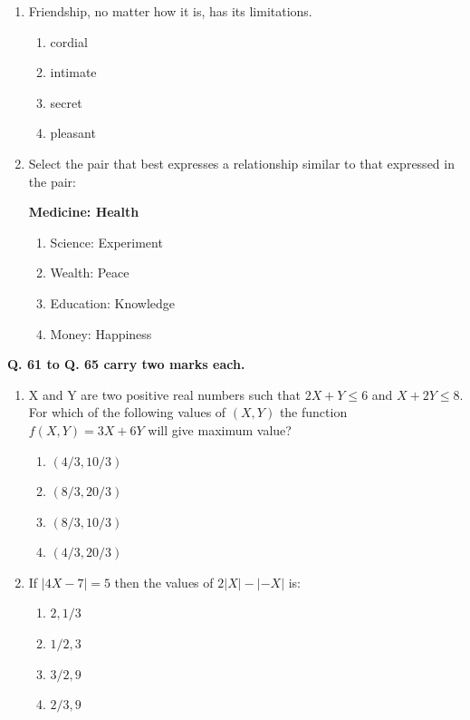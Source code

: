 \documentclass[14pt, a4paper]{extarticle}
\begin{document}
\begin{enumerate}[label=\textbf{Q. \arabic*}]
\begin{enumerate}[label=\textbf{Q.\arabic*}, start=56]
\item Friendship, no matter how \underline{\hspace{8em}} it is, has its limitations.
    \begin{enumerate}
        \item cordial
        \item intimate
        \item secret
        \item pleasant
    \end{enumerate}

\item Select the pair that best expresses a relationship similar to that expressed in the pair:
    \begin{center}
        \textbf{Medicine: Health}
    \end{center}
    \begin{multicols}{2}
        \begin{enumerate}
            \item Science: Experiment
            \item Wealth: Peace
            \item Education: Knowledge
            \item Money: Happiness
        \end{enumerate}
    \end{multicols}
\end{enumerate}

\textbf{Q. 61 to Q. 65 carry two marks each.}

\begin{enumerate}[label=\textbf{Q.\arabic*}, start=61]

    \item X and Y are two positive real numbers such that $2X + Y \le 6$ and $X + 2Y \le 8$. For which of the following values of $(X,Y)$ the function $f(X,Y) = 3X + 6Y$ will give maximum value?
    \begin{enumerate}
        \item $(4/3, 10/3)$
        \item $(8/3, 20/3)$
        \item $(8/3, 10/3)$
        \item $(4/3, 20/3)$
    \end{enumerate}

    \item If $|4X - 7| = 5$ then the values of $2|X| - |-X|$ is:
    \begin{multicols}{4}
        \begin{enumerate}
            \item $2, 1/3$
            \item $1/2, 3$
            \item $3/2, 9$
            \item $2/3, 9$
        \end{enumerate}
    \end{multicols}


\end{enumerate}
\end{enumerate}
\end{document}
